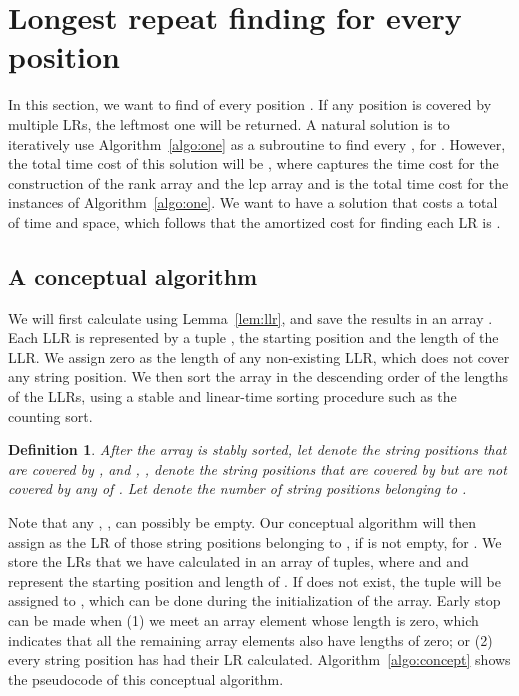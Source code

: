 \documentclass[preprint]{elsarticle}
\newtheorem{definition}{Definition}[section]
\begin{document}
\section{Longest repeat finding for every position}   
\label{sec:every}
In this section, we want to find  of every position
. 
If any position  is covered by multiple LRs, the
leftmost one will be returned.  
A natural solution is to iteratively use Algorithm~\ref{algo:one} as a
subroutine to find every , for . However, the
total time cost of this solution will be , where  captures the time cost for the construction of
the rank array and the lcp array and  is the total
time cost for the  instances of Algorithm~\ref{algo:one}. We want to
have a solution that costs a total of  time and space, which follows
that the amortized cost for finding each LR is .

\subsection{A conceptual algorithm}
\label{subsec:overall}
We will first calculate  using
Lemma~\ref{lem:llr}, and save the results in an array . Each LLR is represented by a tuple , the starting
position and the length of the LLR. We assign zero as the length of
any non-existing LLR, which does not cover any string position. We
then sort the  array in the descending order of the lengths of
the LLRs, using a stable and linear-time sorting procedure such as the
counting sort.  

\begin{definition}
\label{def:p}
After the  array is stably sorted, let 
denote the string positions that are covered by , and ,
, denote the string positions that are covered by
 but are not covered by any of . Let
 denote the number of string positions belonging to .
\end{definition}

Note that any , , can possibly be empty. 
Our conceptual algorithm will then assign  as the LR of
those string positions belonging to , if  is not empty, for
. We store the LRs that we have calculated in an array
 of  tuples, where
 and  and  represent the
starting position and length of .  If  does not exist,
the tuple  will be assigned to , which
can be done during the initialization of the  array.  Early stop
can be made when (1) we meet an  array element whose length is
zero, which indicates that all the remaining  array elements
also have lengths of zero; or (2) every string position has had their
LR calculated. Algorithm~\ref{algo:concept} shows the pseudocode of
this conceptual algorithm.
\end{document}
